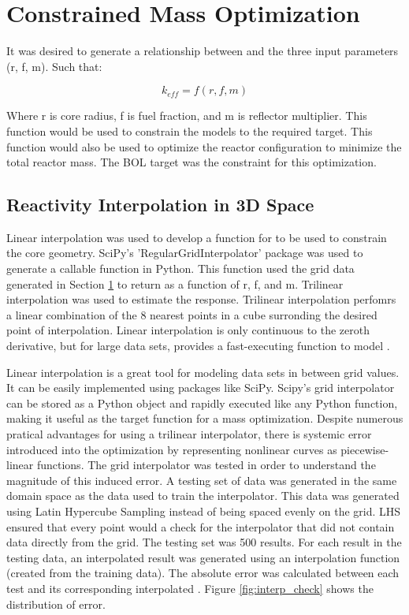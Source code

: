 \section{Constrained Mass Optimization}\label{sec:crit_rad_search}
It was desired to generate a relationship between \keff and the three input
parameters (r, f, m). Such that:

\begin{equation}
    k_{eff} = f(r, f, m)
\label{eq:gen_keff}
\end{equation}

Where r is core radius, f is fuel fraction, and m is reflector multiplier. This
function would be used to constrain the models to the required \keff target.
This function would also be used to optimize the reactor configuration to
minimize the total reactor mass. The BOL \keff target was the constraint for
this optimization.

\subsection{Reactivity Interpolation in 3D Space}
Linear interpolation was used to develop a function for \keff to be used to
constrain the core geometry. SciPy's 'RegularGridInterpolator' package was used
to generate a callable function in Python. This function used the grid data
generated in Section \ref{sec:crit_rad_search} to return \keff as a function of
r, f, and m. Trilinear interpolation was used to estimate the \keff response.
Trilinear interpolation perfomrs a linear combination of the 8 nearest points in
a cube surronding the desired point of interpolation. Linear interpolation is
only continuous to the zeroth derivative, but for large data sets, provides a
fast-executing function to model \keff.

Linear interpolation is a great tool for modeling data sets in between grid
values. It can be easily implemented using packages like SciPy. Scipy's grid
interpolator can be stored as a Python object and rapidly executed like any
Python function, making it useful as the target function for a mass
optimization. Despite numerous pratical advantages for using a trilinear
interpolator, there is systemic error introduced into the optimization by
representing nonlinear curves as piecewise-linear functions. The grid
interpolator was tested in order to understand the magnitude of this induced
error. A testing set of data was generated in the same domain space as the data
used to train the interpolator. This data was generated using Latin Hypercube
Sampling instead of being spaced evenly on the grid. LHS ensured that every
point would a check for the interpolator that did not contain data directly from
the grid. The testing set was 500 \keff results. For each \keff result in the
testing data, an interpolated result was generated using an interpolation
function (created from the training data). The absolute error was calculated
between each test \keff and its corresponding interpolated \keff. Figure
\ref{fig:interp_check} shows the distribution of error.

